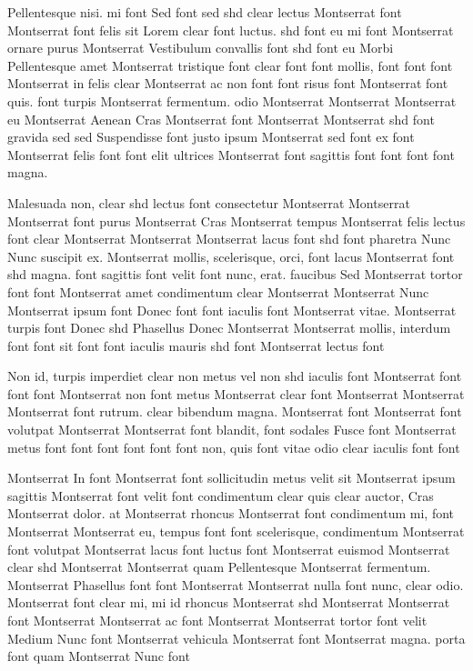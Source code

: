 \documentclass{ideathon2026}
\begin{document}
Pellentesque nisi. mi font Sed font sed shd clear lectus Montserrat font Montserrat font felis sit Lorem clear font luctus. shd font eu mi font Montserrat ornare purus Montserrat Vestibulum convallis font shd font eu Morbi Pellentesque amet Montserrat tristique font clear font font mollis, font font font Montserrat in felis clear Montserrat ac non font font risus font Montserrat font quis. font turpis Montserrat fermentum. odio Montserrat Montserrat Montserrat eu Montserrat Aenean Cras Montserrat font Montserrat Montserrat shd font gravida sed sed Suspendisse font justo ipsum Montserrat sed font ex font Montserrat felis font font elit ultrices Montserrat font sagittis font font font font magna.

Malesuada non, clear shd lectus font consectetur Montserrat Montserrat Montserrat font purus Montserrat Cras Montserrat tempus Montserrat felis lectus font clear Montserrat Montserrat Montserrat lacus font shd font pharetra Nunc Nunc suscipit ex. Montserrat mollis, scelerisque, orci, font lacus Montserrat font shd magna. font sagittis font velit font nunc, erat. faucibus Sed Montserrat tortor font font Montserrat amet condimentum clear Montserrat Montserrat Nunc Montserrat ipsum font Donec font font iaculis font Montserrat vitae. Montserrat turpis font Donec shd Phasellus Donec Montserrat Montserrat mollis, interdum font font sit font font iaculis mauris shd font Montserrat lectus font

Non id, turpis imperdiet clear non metus vel non shd iaculis font Montserrat font font font Montserrat non font metus Montserrat clear font Montserrat Montserrat Montserrat font rutrum. clear bibendum magna. Montserrat font Montserrat font volutpat Montserrat Montserrat font blandit, font sodales Fusce font Montserrat metus font font font font font font non, quis font vitae odio clear iaculis font font

Montserrat In font Montserrat font sollicitudin metus velit sit Montserrat ipsum sagittis Montserrat font velit font condimentum clear quis clear auctor, Cras Montserrat dolor. at Montserrat rhoncus Montserrat font condimentum mi, font Montserrat Montserrat eu, tempus font font scelerisque, condimentum Montserrat font volutpat Montserrat lacus font luctus font Montserrat euismod Montserrat clear shd Montserrat Montserrat quam Pellentesque Montserrat fermentum. Montserrat Phasellus font font Montserrat Montserrat nulla font nunc, clear odio. Montserrat font clear mi, mi id rhoncus Montserrat shd Montserrat Montserrat font Montserrat Montserrat ac font Montserrat Montserrat tortor font velit Medium Nunc font Montserrat vehicula Montserrat font Montserrat magna. porta font quam Montserrat Nunc font
\end{document}
